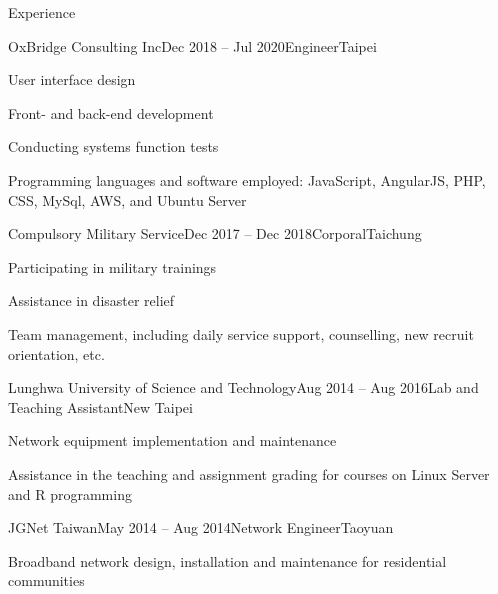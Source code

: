 \documentclass{resume} %
\begin{document}
\begin{rSection}{Experience}

\begin{rSubsection}{OxBridge Consulting Inc}{Dec 2018 – Jul 2020}{Engineer}{Taipei}
\item User interface design
\item Front- and back-end development
\item Conducting systems function tests
\item Programming languages and software employed: JavaScript, AngularJS, PHP, CSS, MySql, AWS, and Ubuntu Server 
\end{rSubsection}


\begin{rSubsection}{Compulsory Military Service}{Dec 2017 – Dec 2018}{Corporal}{Taichung}
\item Participating in military trainings
\item Assistance in disaster relief
\item Team management, including daily service support, counselling, new recruit orientation, etc.
\end{rSubsection}


\begin{rSubsection}{Lunghwa University of Science and Technology}{Aug 2014 – Aug 2016}{Lab and Teaching Assistant}{New Taipei}
\item Network equipment implementation and maintenance
\item Assistance in the teaching and assignment grading for courses on Linux Server and R programming
\end{rSubsection}
\begin{rSubsection}{JGNet Taiwan}{May 2014 – Aug 2014}{Network Engineer}{Taoyuan}
\item Broadband network design, installation and maintenance for residential communities
\end{rSubsection}
\end{rSection}

\end{document}
